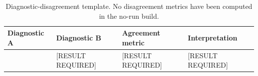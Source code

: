 \begin{table}[t]
\centering
\caption{Diagnostic-disagreement template. No disagreement metrics have been computed in the no-run build.}
\begin{tabular}{llll}
\toprule
Diagnostic A & Diagnostic B & Agreement metric & Interpretation \\
\midrule
[RESULT REQUIRED] & [RESULT REQUIRED] & [RESULT REQUIRED] & [RESULT REQUIRED] \\
\bottomrule
\end{tabular}
\end{table}
